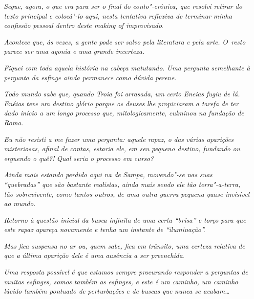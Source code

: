 \emph{\asterisc{}}

\emph{Segue, agora, o que era para ser o final do conto"-crônica, que
resolvi retirar do texto principal e colocá"-lo aqui, nesta tentativa
reflexiva de terminar minha confissão pessoal dentro deste making of
improvisado.}~

\emph{Acontece que, às vezes, a gente pode ser salvo pela literatura e
pela arte. O~resto parece ser uma agonia e uma grande incerteza.}~

\emph{Fiquei com toda aquela história na cabeça matutando. Uma pergunta
semelhante à pergunta da esfinge ainda permanece como dúvida perene.}~

\emph{Todo mundo sabe que, quando Troia foi arrasada, um certo Eneias
fugiu de lá. Enéias teve um destino glório porque os deuses lhe
propiciaram a tarefa de ter dado início a um longo processo que,
mitologicamente, culminou na fundação de Roma.}~

\emph{Eu não resisti a me fazer uma pergunta: aquele rapaz, o das várias
aparições misteriosas, afinal de contas, estaria ele, em seu pequeno
destino, fundando ou erguendo o quê?! Qual seria o processo em curso?}~

\emph{Ainda mais estando perdido aqui na  de Sampa, movendo"-se nas
suas ``quebradas'' que são bastante realistas, ainda mais sendo ele tão
terra"-a-terra, tão sobrevivente, como tantos outros, de uma outra guerra
pequena quase invisível ao mundo.}~

\emph{Retorno à questão inicial da busca infinita de uma certa ``brisa''
e torço para que este rapaz apareça novamente e tenha um instante de
``iluminação''.}~

\emph{Mas fica suspensa no ar ou, quem sabe, fica em trânsito, uma
certeza relativa de que a última aparição dele é uma ausência a ser
preenchida.}

\emph{Uma resposta possível é que estamos sempre procurando responder a
perguntas de muitas esfinges, somos também as esfinges, e este é um
caminho, um caminho lúcido também pontuado de perturbações e de buscas
que nunca se acabam…~}
\endgroup